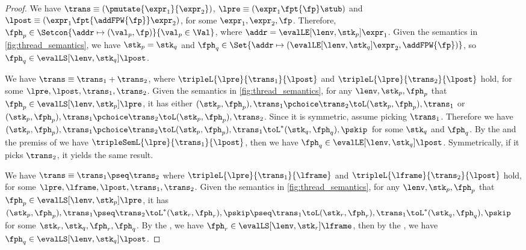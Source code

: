 \begin{proof}

We have \( \trans \equiv (\pmutate{\expr_{1}}{\expr_{2}}) \), \( \lpre \equiv ( \expr_{1} \fpt{\fp} \stub ) \) and \( \lpost \equiv ( \expr_{1} \fpt{\addFPW{\fp}} \expr_{2} ) \), for some \( \expr_{1}, \expr_{2}, \fp \).
Therefore, \( \fph_{p} \in \Setcon{ \addr \mapsto (\val_{p} , \fp) }{ \val_{p} \in \Val } \), where \( \addr = \evalLE[\lenv, \stk_{p}]{\expr_{1}} \).
Given the semantics in \fig \ref{fig:thread_semantics}, we have \( \stk_{p} = \stk_{q} \) and \( \fph_{q} \in \Set{\addr \mapsto ( \evalLE[\lenv, \stk_{q}]{\expr_{2}},  \addFPW{\fp} ) } \), so \( \fph_{q} \in \evalLS[\lenv, \stk_{q}]{\lpost} \).


We have  \(\trans \equiv \trans_{1} + \trans_{2} \), where \( \tripleL{\lpre}{\trans_{1}}{\lpost} \) and \( \tripleL{\lpre}{\trans_{2}}{\lpost} \) hold, for some \( \lpre, \lpost, \trans_{1}, \trans_{2} \).
Given the semantics in \fig \ref{fig:thread_semantics}, for any \( \lenv, \stk_{p}, \fph_{p} \) that \( \fph_{p} \in \evalLS[\lenv, \stk_{p}]{\lpre} \), it has either \( ( \stk_{p}, \fph_{p} ), \trans_{1} \pchoice \trans_{2} \toL ( \stk_{p}, \fph_{p} ), \trans_{1} \) or  \( ( \stk_{p}, \fph_{p} ), \trans_{1} \pchoice \trans_{2} \toL ( \stk_{p}, \fph_{p} ), \trans_{2} \).
Since it is symmetric, assume picking \( \trans_{1} \).
Therefore we have \( ( \stk_{p}, \fph_{p} ), \trans_{1} \pchoice \trans_{2} \toL ( \stk_{p}, \fph_{p} ), \trans_{1} \toL^{*} ( \stk_{q}, \fph_{q} ), \pskip \) for some \( \stk_{q} \) and \( \fph_{q} \).
By the \ih and the premiss of  we have \( \tripleSemL{\lpre}{\trans_{1}}{\lpost} \), then we have \( \fph_{q} \in \evalLE[\lenv, \stk_{q}]{\lpost} \).
Symmetrically, if it picks \( \trans_{2} \), it yields the same result.


We have \( \trans \equiv \trans_{1} \pseq \trans_{2} \) where \( \tripleL{\lpre}{\trans_{1}}{\lframe} \) and \( \tripleL{\lframe}{\trans_{2}}{\lpost} \) hold, for some \( \lpre, \lframe, \lpost, \trans_{1}, \trans_{2} \).
Given the semantics in \fig \ref{fig:thread_semantics}, for any \( \lenv, \stk_{p}, \fph_{p} \) that \( \fph_{p} \in \evalLS[\lenv, \stk_{p}]{\lpre} \), it has \( ( \stk_{p}, \fph_{p} ), \trans_{1} \pseq \trans_{2} \toL^{*} ( \stk_{r}, \fph_{r} ), \pskip \pseq \trans_{1} \toL ( \stk_{r}, \fph_{r} ), \trans_{1} \toL^{*} ( \stk_{q}, \fph_{q} ), \pskip \) for some \( \stk_{r}, \stk_{q}, \fph_{r}, \fph_{q} \).
By the \ih, we have \( \fph_{r} \in \evalLS[\lenv, \stk_{r}]{\lframe} \), then by the \ih, we have \( \fph_{q} \in \evalLS[\lenv, \stk_{q}]{\lpost} \).


\end{proof}
